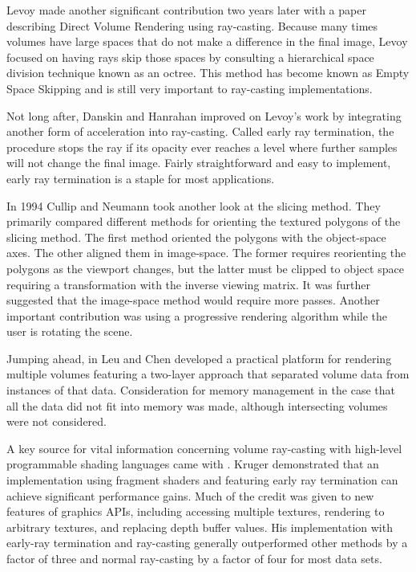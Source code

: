 \documentclass{article}
\begin{document}
Levoy made another significant contribution two years later with a paper
\cite{Levoy90} describing Direct Volume Rendering using ray-casting.  Because
many times volumes have large spaces that do not make a difference in the final
image, Levoy focused on having rays skip those spaces by consulting a
hierarchical space division technique known as an octree.  This method has
become known as Empty Space Skipping and is still very important to ray-casting
implementations.

Not long after, Danskin and Hanrahan \cite{Danskin92} improved on Levoy’s work
by integrating another form of acceleration into ray-casting.  Called early ray
termination, the procedure stops the ray if its opacity ever reaches a level
where further samples will not change the final image.  Fairly straightforward
and easy to implement, early ray termination is a staple for most applications.

In 1994 Cullip and Neumann \cite{Cullip94} took another look at the slicing
method.  They primarily compared different methods for orienting the textured
polygons of the slicing method.  The first method oriented the polygons with the
object-space axes.  The other aligned them in image-space.  The former requires
reorienting the polygons as the viewport changes, but the latter must be clipped
to object space requiring a transformation with the inverse viewing matrix.  It
was further suggested that the image-space method would require more passes.
Another important contribution was using a progressive rendering algorithm while
the user is rotating the scene.

Jumping ahead, in \cite{Leu99} Leu and Chen developed a practical platform for
rendering multiple volumes featuring a two-layer approach that separated volume
data from instances of that data.  Consideration for memory management in the
case that all the data did not fit into memory was made, although intersecting
volumes were not considered.

A key source for vital information concerning volume ray-casting with high-level
programmable shading languages came with \cite{Kruger03}.  Kruger demonstrated
that an implementation using fragment shaders and featuring early ray
termination can achieve significant performance gains.  Much of the credit was
given to new features of graphics APIs, including accessing multiple textures,
rendering to arbitrary textures, and replacing depth buffer values.  His
implementation with early-ray termination and ray-casting generally outperformed
other methods by a factor of three and normal ray-casting by a factor of four
for most data sets.
\end{document}
